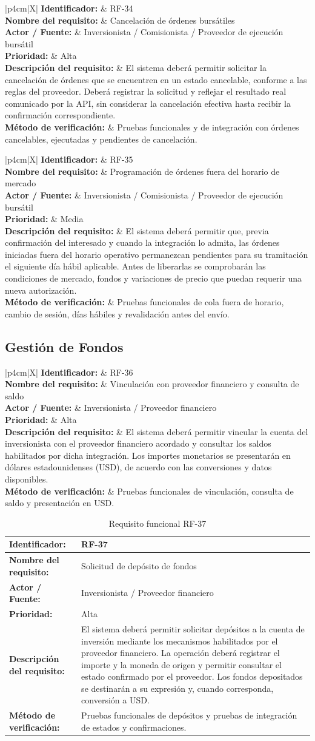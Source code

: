 \documentclass[11pt,a4paper,oneside]{article}
\newcommand{\tablaRequisito}[6]{%
\begin{table}[H]
\centering
\begin{tabularx}{\linewidth}{|p{4cm}|X|}
\hline
\textbf{Identificador:} & #1 \\ \hline
\textbf{Nombre del requisito:} & #2 \\ \hline
\textbf{Actor / Fuente:} & #3 \\ \hline
\textbf{Prioridad:} & #4 \\ \hline
\textbf{Descripción del requisito:} &
#5 \\ \hline
\textbf{Método de verificación:} & #6 \\ \hline
\end{tabularx}
\caption{Requisito funcional #1}
\label{tab:#1}
\end{table}
}
\begin{document}
\tablaRequisito
{RF-34}
{Cancelación de órdenes bursátiles}
{Inversionista / Comisionista / Proveedor de ejecución bursátil}
{Alta}
{El sistema deberá permitir solicitar la cancelación de órdenes que se encuentren en un estado cancelable, conforme a las reglas del proveedor. Deberá registrar la solicitud y reflejar el resultado real comunicado por la API, sin considerar la cancelación efectiva hasta recibir la confirmación correspondiente.}
{Pruebas funcionales y de integración con órdenes cancelables, ejecutadas y pendientes de cancelación.}


\tablaRequisito
{RF-35}
{Programación de órdenes fuera del horario de mercado}
{Inversionista / Comisionista / Proveedor de ejecución bursátil}
{Media}
{El sistema deberá permitir que, previa confirmación del interesado y cuando la integración lo admita, las órdenes iniciadas fuera del horario operativo permanezcan pendientes para su tramitación el siguiente día hábil aplicable. Antes de liberarlas se comprobarán las condiciones de mercado, fondos y variaciones de precio que puedan requerir una nueva autorización.}
{Pruebas funcionales de cola fuera de horario, cambio de sesión, días hábiles y revalidación antes del envío.}


\subsection{Gestión de Fondos}

\tablaRequisito
{RF-36}
{Vinculación con proveedor financiero y consulta de saldo}
{Inversionista / Proveedor financiero}
{Alta}
{El sistema deberá permitir vincular la cuenta del inversionista con el proveedor financiero acordado y consultar los saldos habilitados por dicha integración. Los importes monetarios se presentarán en dólares estadounidenses (USD), de acuerdo con las conversiones y datos disponibles.}
{Pruebas funcionales de vinculación, consulta de saldo y presentación en USD.}


\tablaRequisito
{RF-37}
{Solicitud de depósito de fondos}
{Inversionista / Proveedor financiero}
{Alta}
{El sistema deberá permitir solicitar depósitos a la cuenta de inversión mediante los mecanismos habilitados por el proveedor financiero. La operación deberá registrar el importe y la moneda de origen y permitir consultar el estado confirmado por el proveedor. Los fondos depositados se destinarán a su expresión y, cuando corresponda, conversión a USD.}
{Pruebas funcionales de depósitos y pruebas de integración de estados y confirmaciones.}
\end{document}

